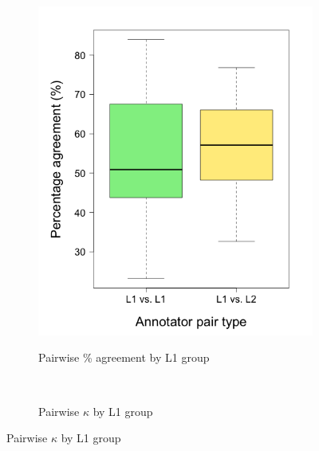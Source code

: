 		\begin{figure}[h!]
			\centering
			
			
			\begin{subfigure}{.5\textwidth}
				\centering
				\caption{Pairwise \% agreement by L1 group}
				\includegraphics[width=\textwidth]{img/plots/pairwisePctByL1-noTitle}
				\label{fig:agreement:L1:pct}
			\end{subfigure}%
			~
			\begin{subfigure}{.5\textwidth}
				\centering
				\caption{Pairwise $\kappa$ by L1 group}

\end{subfigure}
\end{figure}
